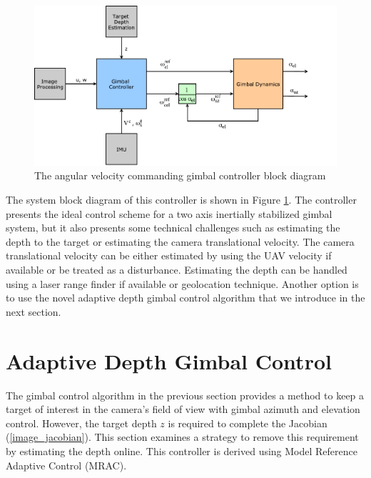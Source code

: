 \begin{figure}[htbp]
	\centering
	\includegraphics[width = 5in]{images/chapter2/gp_blockdiagram.pdf}
	\caption{The angular velocity commanding gimbal controller block diagram}
	\label{avcg_blockdiagram}
\end{figure}
The system block diagram of this controller is shown in Figure \ref{avcg_blockdiagram}. The controller presents the ideal control scheme for a two axis inertially stabilized gimbal system, but it also presents some technical challenges such as estimating the depth to the target or estimating the camera translational velocity. The camera translational velocity can be either estimated by using the UAV velocity if available or be treated as a disturbance. Estimating the depth can be handled using a laser range finder if available or geolocation technique. Another option is to use the novel adaptive depth gimbal control algorithm that we introduce in the next section.

\section{Adaptive Depth Gimbal Control}
The gimbal control algorithm in the previous section provides a method to keep a target of interest in the camera's field of view with gimbal azimuth and elevation control. However, the target depth $z$ is required to complete the Jacobian (\ref{image_jacobian}). This section examines a strategy to remove this requirement by estimating the depth online. This controller is derived using Model Reference Adaptive Control (MRAC).

